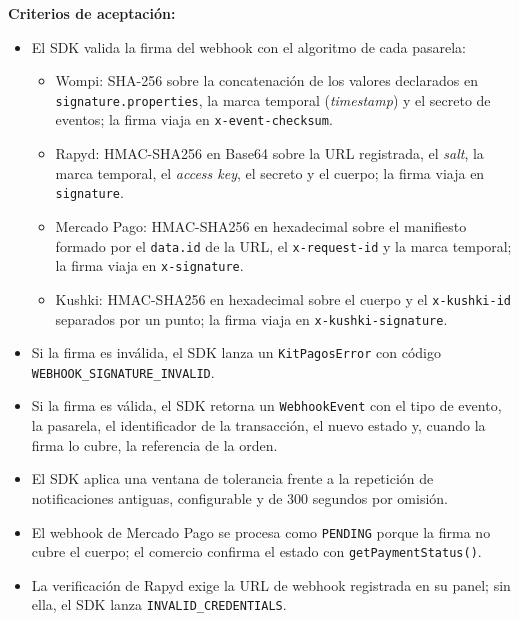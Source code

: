 \textbf{Criterios de aceptación:}
\begin{itemize}
  \item El SDK valida la firma del webhook con el algoritmo de cada pasarela:
    \begin{itemize}
      \item Wompi: SHA-256 sobre la concatenación de los valores declarados en \texttt{signature.properties}, la marca temporal (\textit{timestamp}) y el secreto de eventos; la firma viaja en \texttt{x-event-checksum}.
      \item Rapyd: HMAC-SHA256 en Base64 sobre la URL registrada, el \textit{salt}, la marca temporal, el \textit{access key}, el secreto y el cuerpo; la firma viaja en \texttt{signature}.
      \item Mercado Pago: HMAC-SHA256 en hexadecimal sobre el manifiesto formado por el \texttt{data.id} de la URL, el \texttt{x-request-id} y la marca temporal; la firma viaja en \texttt{x-signature}.
      \item Kushki: HMAC-SHA256 en hexadecimal sobre el cuerpo y el \texttt{x-kushki-id} separados por un punto; la firma viaja en \texttt{x-kushki-signature}.
    \end{itemize}
  \item Si la firma es inválida, el SDK lanza un \texttt{KitPagosError} con código \texttt{WEBHOOK\_SIGNATURE\_INVALID}.
  \item Si la firma es válida, el SDK retorna un \texttt{WebhookEvent} con el tipo de evento, la pasarela, el identificador de la transacción, el nuevo estado y, cuando la firma lo cubre, la referencia de la orden.
  \item El SDK aplica una ventana de tolerancia frente a la repetición de notificaciones antiguas, configurable y de 300 segundos por omisión.
  \item El webhook de Mercado Pago se procesa como \texttt{PENDING} porque la firma no cubre el cuerpo; el comercio confirma el estado con \texttt{getPaymentStatus()}.
  \item La verificación de Rapyd exige la URL de webhook registrada en su panel; sin ella, el SDK lanza \texttt{INVALID\_CREDENTIALS}.
\end{itemize}

